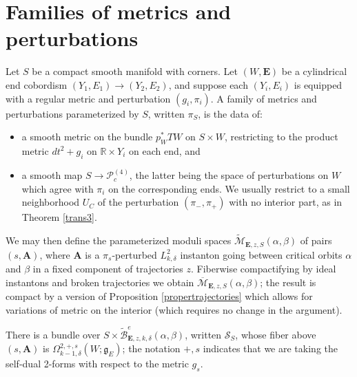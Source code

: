 \documentclass{memo-l}
\theoremstyle{definition}
\theoremstyle{remark}
\numberwithin{section}{chapter}
\numberwithin{equation}{chapter}
\begin{document}
\section{Families of metrics and perturbations}\label{famsec}\label{sec:4d-families}
Let $S$ be a compact smooth manifold with corners. Let $(W,\mathbf{E})$ be a cylindrical end cobordism $(Y_1, E_1) \to (Y_2, E_2)$, and suppose each $(Y_i, E_i)$ is equipped with a regular metric and perturbation $(g_i,\pi_i)$. A family of metrics and perturbations parameterized by $S$, written $\pi_S$, is the data of:
\begin{itemize}
\item a smooth metric on the bundle $p_W^*TW$ on $S \times W$, restricting to the product metric $dt^2 + g_i$ on $\mathbb R \times Y_i$ on each end, and
\item a smooth map $S \to \mathcal P^{(4)}_c$, the latter being the space of perturbations on $W$ which agree with $\pi_i$ on the corresponding ends. We usually restrict to a small neighborhood $U_C$ of the perturbation $(\pi_-,\pi_+)$ with no interior part, as in Theorem \ref{trans3}.
\end{itemize}

We may then define the parameterized moduli spaces $\widetilde{\mathcal M}_{\mathbf{E},z,S}(\alpha, \beta)$ of pairs $(s,\mathbf{A})$, where $\mathbf{A}$ is a $\pi_s$-perturbed $L^2_{k,\delta}$ instanton going between critical orbits $\alpha$ and $\beta$ in a fixed component of trajectories $z$. Fiberwise compactifying by ideal instantons and broken trajectories we obtain $\overline{\mathcal M}_{\mathbf{E},z,S}(\alpha, \beta)$; the result is compact by a version of Proposition \ref{propertrajectories} which allows for variations of metric on the interior (which requires no change in the argument).

There is a bundle over $S \times \widetilde{\mathcal B}^e_{\mathbf{E}, z,k,\delta}(\alpha, \beta)$, written $\mathcal S_S$, whose fiber above $(s, \mathbf{A})$ is $\Omega^{2,+,s}_{k-1,\delta}(W;\mathfrak g_E)$; the notation $+,s$ indicates that we are taking the self-dual 2-forms with respect to the metric $g_s$.
\end{document}
